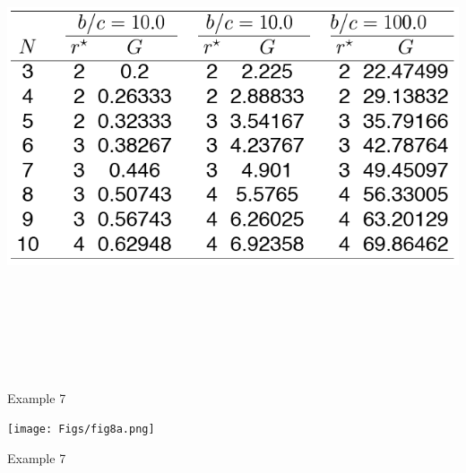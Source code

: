 \documentclass[12pt]{article}
\newcommand{\headsize}{\fontsize{35}{35} \selectfont}
\begin{document}
\centerline{\includegraphics[height=5.5in]{Figs/tableB.png}}


\newpage


\headsize \color{yellow}
\hfill \begin{minipage}{5.75in}
\centering
Example 7
\end{minipage}

\vspace{30mm}

\centerline{\texttt{[image: Figs/fig8a.png]}}


\newpage


\headsize \color{yellow}
\hfill \begin{minipage}{5.75in}
\centering
Example 7
\end{minipage}

\vspace{30mm}
\end{document}
